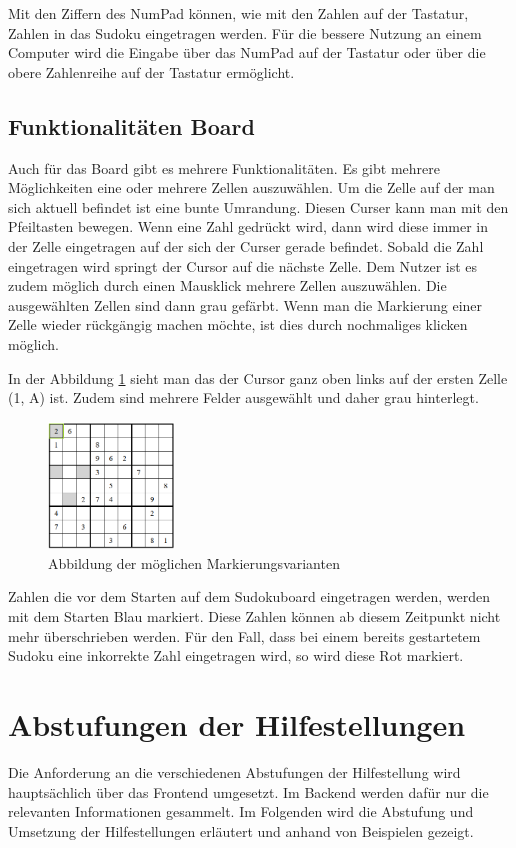 Mit den Ziffern des NumPad können, wie mit den Zahlen auf der Tastatur, Zahlen in das Sudoku eingetragen werden. Für die bessere Nutzung an einem Computer wird die Eingabe über das NumPad auf der Tastatur oder über die obere Zahlenreihe auf der Tastatur ermöglicht.

\subsection{Funktionalitäten Board}
Auch für das Board gibt es mehrere Funktionalitäten. Es gibt mehrere Möglichkeiten eine oder mehrere Zellen auszuwählen. Um die Zelle auf der man sich aktuell befindet ist eine bunte Umrandung. Diesen Curser kann man mit den Pfeiltasten bewegen. Wenn eine Zahl gedrückt wird, dann wird diese immer in der Zelle eingetragen auf der sich der Curser gerade befindet. Sobald die Zahl eingetragen wird springt der Cursor auf die nächste Zelle. Dem Nutzer ist es zudem möglich durch einen Mausklick mehrere Zellen auszuwählen. Die ausgewählten Zellen sind dann grau gefärbt. Wenn man die Markierung einer Zelle wieder rückgängig machen möchte, ist dies durch nochmaliges klicken möglich. 

In der Abbildung \ref{fig:Markierungen} sieht man das der Cursor ganz oben links auf der ersten Zelle (1, A) ist. Zudem sind mehrere Felder ausgewählt und daher grau hinterlegt.

\begin{figure}[htbp]
	\centering
	\includegraphics[width=0.3\textwidth]{images/Markierungen.png}
	\caption{Abbildung der möglichen Markierungsvarianten}
	\label{fig:Markierungen}
\end{figure}

Zahlen die vor dem Starten auf dem Sudokuboard eingetragen werden, werden mit dem Starten Blau markiert. Diese Zahlen können ab diesem Zeitpunkt nicht mehr überschrieben werden. Für den Fall, dass bei einem bereits gestartetem Sudoku eine inkorrekte Zahl eingetragen wird, so wird diese Rot markiert.


\section{Abstufungen der Hilfestellungen}
Die Anforderung an die verschiedenen Abstufungen der Hilfestellung wird hauptsächlich über das Frontend umgesetzt. Im Backend werden dafür nur die relevanten Informationen gesammelt. Im Folgenden wird die Abstufung und Umsetzung der Hilfestellungen erläutert und anhand von Beispielen gezeigt.

